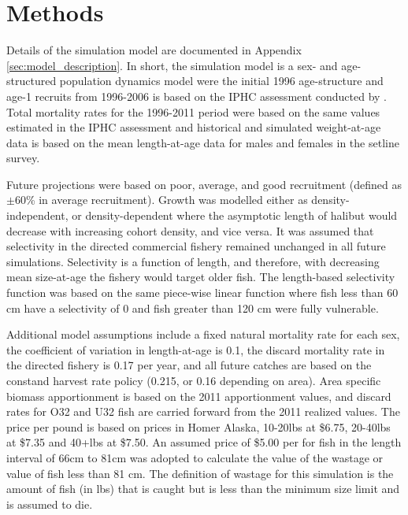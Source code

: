 \section{Methods} %
\label{sec:methods}

Details of the simulation model are documented in Appendix \ref{sec:model_description}.  In short, the simulation model is a sex- and age-structured population dynamics model were the initial 1996 age-structure and age-1 recruits from 1996-2006 is based on the IPHC assessment conducted by \cite{Hare2012Rara}.  Total mortality rates for the 1996-2011 period were based on the same values estimated in the IPHC assessment and historical and simulated weight-at-age data is based on the mean length-at-age data  for males and females  in the setline survey.  

Future projections were based on poor, average, and good recruitment (defined as $\pm$60\% in average recruitment).  Growth was modelled either as density-independent, or density-dependent where the asymptotic length of halibut would decrease with increasing cohort density, and vice versa.  It was assumed that selectivity in the directed commercial fishery remained unchanged in all future simulations.  Selectivity is a function of length, and therefore, with decreasing mean size-at-age the fishery would target older fish.  The length-based selectivity function was based on the same piece-wise linear function where fish less than 60 cm have a selectivity of 0 and fish greater than 120 cm were fully vulnerable.  

Additional model assumptions include a fixed natural mortality rate for each sex, the coefficient of variation in length-at-age is 0.1, the discard mortality rate in the directed fishery is 0.17 per year, and all future catches are based on the constand harvest rate policy (0.215, or 0.16 depending on area).  Area specific biomass apportionment is based on the 2011 apportionment values, and discard rates for O32 and U32 fish are carried forward from the 2011 realized values. The price per pound is based on prices in Homer Alaska, 10-20lbs at \$6.75, 20-40lbs at \$7.35 and 40+lbs at \$7.50.  An assumed price of \$5.00 per for fish in the length interval of 66cm to 81cm was adopted to calculate the value of the wastage or value of fish less than 81 cm.  The definition of wastage for this simulation is the amount of fish (in lbs) that is caught but is less than the minimum size limit and is assumed to die.

